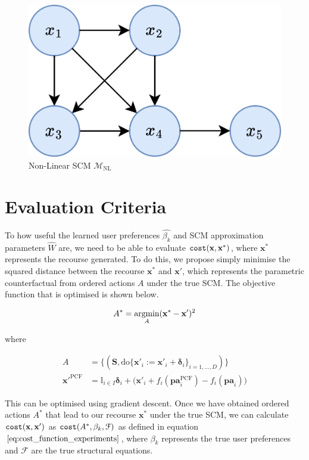 \begin{figure}[!htb]
	\centering
	\includegraphics[width=0.5\linewidth]{images/draw.io/non_linear_scm.png}
	\caption{Non-Linear SCM $\mathcal{M}_{\text{NL}}$}
	\label{fig:non_linear_scm}
\end{figure}


\section{Evaluation Criteria} 

To how useful the learned user preferences $\hat{\beta_k}$ and SCM approximation parameters $\hat{W}$ are, we need to be able to evaluate $\operatorname*{\texttt{cost}}(\mathbf{x,x}^*)$, where $\mathbf{x}^*$ represents the recourse generated. To do this, we propose simply minimise the squared distance between the recourse $\mathbf{x}^*$ and $\mathbf{x}'$, which represents the parametric counterfactual from ordered actions $A$ under the true SCM. The objective function that is optimised is shown below.

\begin{equation}
	A^* = \operatorname*{argmin}_{A} (\mathbf{x}^* - \mathbf{x}')^2
\end{equation}

where

\begin{align}
	A & = \big\{(\mathbf{S}, \text{do} \{\mathbf{x}'_i:=\mathbf{x}'_i + \boldsymbol{\delta}_i\}_{i=1, \ldots, D})\big\} \\ \nonumber
	{\mathbf{x}'}^{\text{PCF}} & = \mathbb{I}_{i \in I} \boldsymbol{\delta}_i + \bigg( \mathbf{x}'_i + f_i(\textbf{pa}^{\text{PCF}}_i) - f_i(\textbf{pa}_i) \bigg)
\end{align}

This can be optimised using gradient descent. Once we have obtained ordered actions $A^*$ that lead to our recourse $\mathbf{x}^*$ under the true SCM, we can calculate $\operatorname*{\texttt{cost}}(\mathbf{x,x}')$ as $\operatorname*{\texttt{cost}}(A^*, \beta_k, \mathcal{F})$ as defined in equation $\ref{eq:cost_function_experiments}$, where $\beta_k$ represents the true user preferences and $\mathcal{F}$ are the true structural equations.


